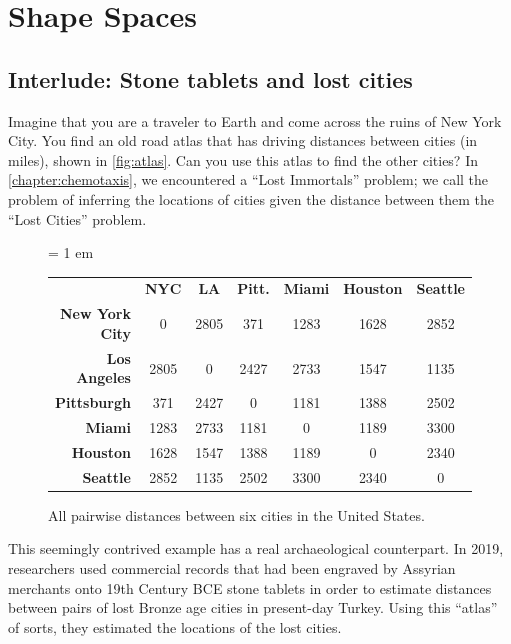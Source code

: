 \FloatBarrier
{}

\section{Shape Spaces}
\label{sec:shape_spaces}

\subsection{Interlude: Stone tablets and lost cities}

Imagine that you are a traveler to Earth and come across the ruins of New York City. You find an old road atlas that has driving distances between cities (in miles), shown in \autoref{fig:atlas}. Can you use this atlas to find the other cities? In \autoref{chapter:chemotaxis}, we encountered a ``Lost Immortals'' problem; we call the problem of inferring the locations of cities given the distance between them the ``Lost Cities'' problem.\\

\begin{figure}[h]
\centering
\tabcolsep = 1 em
\mySfFamily
\begin{tabular}{r c c c c c c}
& \textbf{NYC} & \textbf{LA} & \textbf{Pitt.} & \textbf{Miami} & \textbf{Houston} & \textbf{Seattle} \\
\textbf{New York City} & 0 & 2805 & 371 & 1283 & 1628 & 2852 \\
\textbf{Los Angeles} & 2805 & 0 & 2427 & 2733 & 1547 & 1135 \\
\textbf{Pittsburgh} & 371 & 2427 & 0 & 1181 & 1388 & 2502 \\
\textbf{Miami} & 1283 & 2733 & 1181 & 0 & 1189 & 3300 \\
\textbf{Houston} & 1628 & 1547 & 1388 & 1189 & 0 & 2340 \\
\textbf{Seattle} & 2852 & 1135 & 2502 & 3300 & 2340 & 0 \\
\end{tabular}
\caption{All pairwise distances between six cities in the United States.}
\label{fig:atlas}
\end{figure}

\begin{qbox}\end{qbox}

This seemingly contrived example has a real archaeological counterpart. In 2019, researchers used commercial records that had been engraved by Assyrian merchants onto 19th Century BCE stone tablets in order to estimate distances between pairs of lost Bronze age cities in present-day Turkey. Using this ``atlas'' of sorts, they estimated the locations of the lost cities.

